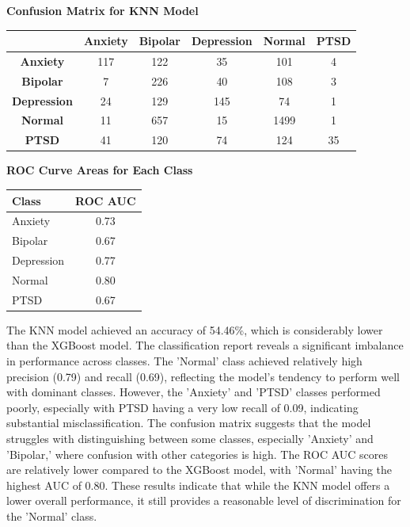 \vspace{0.25em}

\begin{center}
    \textbf{Confusion Matrix for KNN Model} \\[0.5em]
    \begin{tabular}{|c|c|c|c|c|c|}
        \hline
        & \textbf{Anxiety} & \textbf{Bipolar} & \textbf{Depression} & \textbf{Normal} & \textbf{PTSD} \\ \hline
        \textbf{Anxiety}    & 117 & 122 & 35  & 101 & 4   \\ \hline
        \textbf{Bipolar}    & 7   & 226 & 40  & 108 & 3   \\ \hline
        \textbf{Depression} & 24  & 129 & 145 & 74  & 1   \\ \hline
        \textbf{Normal}     & 11  & 657 & 15  & 1499 & 1  \\ \hline
        \textbf{PTSD}       & 41  & 120 & 74  & 124 & 35  \\ \hline
    \end{tabular}
\end{center}

\vspace{0.25em}

\begin{center}
    \textbf{ROC Curve Areas for Each Class} \\[0.5em]
    \begin{tabular}{|l|c|}
        \hline
        \textbf{Class}  & \textbf{ROC AUC} \\ \hline
        Anxiety         & 0.73            \\ \hline
        Bipolar         & 0.67            \\ \hline
        Depression      & 0.77            \\ \hline
        Normal          & 0.80            \\ \hline
        PTSD            & 0.67            \\ \hline
    \end{tabular}
\end{center}

\vspace{0.25em}

\noindent
The KNN model achieved an accuracy of 54.46\%, which is considerably lower than the XGBoost model. The classification report reveals a significant imbalance in performance across classes. The 'Normal' class achieved relatively high precision (0.79) and recall (0.69), reflecting the model's tendency to perform well with dominant classes. However, the 'Anxiety' and 'PTSD' classes performed poorly, especially with PTSD having a very low recall of 0.09, indicating substantial misclassification. The confusion matrix suggests that the model struggles with distinguishing between some classes, especially 'Anxiety' and 'Bipolar,' where confusion with other categories is high. The ROC AUC scores are relatively lower compared to the XGBoost model, with 'Normal' having the highest AUC of 0.80. These results indicate that while the KNN model offers a lower overall performance, it still provides a reasonable level of discrimination for the 'Normal' class.

